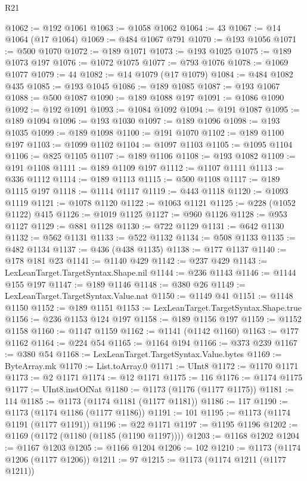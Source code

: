 \begin{lexlean}{R21}
\begin{coremodule}
@1062 := @192 @1061
@1063 := @1058 @1062
@1064 := 43
@1067 := @14 @1064 (@17 @1064)
@1069 := @484 @1067 @791
@1070 := @193 @1056
@1071 := @500 @1070
@1072 := @189 @1071
@1073 := @193 @1025
@1075 := @189 @1073 @197
@1076 := @1072 @1075
@1077 := @793 @1076
@1078 := @1069 @1077
@1079 := 44
@1082 := @14 @1079 (@17 @1079)
@1084 := @484 @1082 @435
@1085 := @193 @1045
@1086 := @189 @1085
@1087 := @193 @1067
@1088 := @500 @1087
@1090 := @189 @1088 @197
@1091 := @1086 @1090
@1092 := @192 @1091
@1093 := @1084 @1092
@1094 := @191 @1087
@1095 := @189 @1094
@1096 := @193 @1030
@1097 := @189 @1096
@1098 := @193 @1035
@1099 := @189 @1098
@1100 := @191 @1070
@1102 := @189 @1100 @197
@1103 := @1099 @1102
@1104 := @1097 @1103
@1105 := @1095 @1104
@1106 := @825 @1105
@1107 := @189 @1106
@1108 := @193 @1082
@1109 := @191 @1108
@1111 := @189 @1109 @197
@1112 := @1107 @1111
@1113 := @336 @1112
@1114 := @189 @1113
@1115 := @500 @1108
@1117 := @189 @1115 @197
@1118 := @1114 @1117
@1119 := @443 @1118
@1120 := @1093 @1119
@1121 := @1078 @1120
@1122 := @1063 @1121
@1125 := @228 (@1052 @1122) @415
@1126 := @1019 @1125
@1127 := @960 @1126
@1128 := @953 @1127
@1129 := @881 @1128
@1130 := @722 @1129
@1131 := @642 @1130
@1132 := @562 @1131
@1133 := @522 @1132
@1134 := @508 @1133
@1135 := @482 @1134
@1137 := @436 (@438 @1135)
@1138 := @177 @1137
@1140 := @178 @181 @23
@1141 := @1140 @429
@1142 := @237 @429
@1143 := LexLeanTarget.TargetSyntax.Shape.nil
@1144 := @236 @1143
@1146 := @1144 @155 @197
@1147 := @189 @1146
@1148 := @380 @26
@1149 := LexLeanTarget.TargetSyntax.Value.nat
@1150 := @1149 @41
@1151 := @1148 @1150
@1152 := @189 @1151
@1153 := LexLeanTarget.TargetSyntax.Shape.true
@1156 := @236 @1153 @124 @197
@1158 := @189 @1156 @197
@1159 := @1152 @1158
@1160 := @1147 @1159
@1162 := @1141 (@1142 @1160)
@1163 := @177 @1162
@1164 := @224 @54
@1165 := @1164 @194
@1166 := @373 @239
@1167 := @380 @54
@1168 := LexLeanTarget.TargetSyntax.Value.bytes
@1169 := ByteArray.mk
@1170 := List.toArray.{0}
@1171 := UInt8
@1172 := @1170 @1171
@1173 := @2 @1171
@1174 := @12 @1171
@1175 := 116
@1176 := @1174 @1175
@1177 := UInt8.instOfNat
@1180 := @1173 (@1176 (@1177 @1175))
@1181 := 114
@1185 := @1173 (@1174 @1181 (@1177 @1181))
@1186 := 117
@1190 := @1173 (@1174 @1186 (@1177 @1186))
@1191 := 101
@1195 := @1173 (@1174 @1191 (@1177 @1191))
@1196 := @22 @1171
@1197 := @1195 @1196
@1202 := @1169 (@1172 (@1180 (@1185 (@1190 @1197))))
@1203 := @1168 @1202
@1204 := @1167 @1203
@1205 := @1166 @1204
@1206 := 102
@1210 := @1173 (@1174 @1206 (@1177 @1206))
@1211 := 97
@1215 := @1173 (@1174 @1211 (@1177 @1211))

\end{coremodule}
\end{lexlean}
